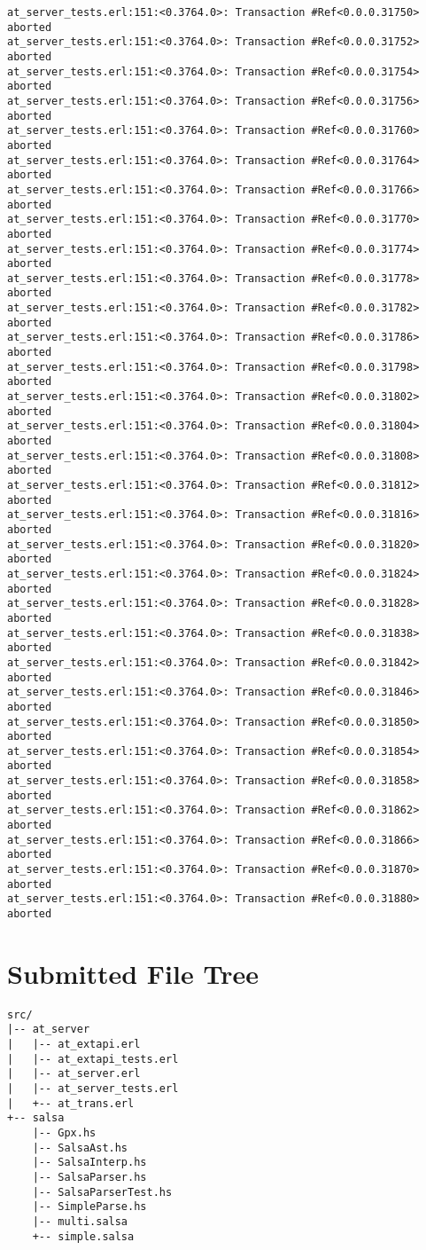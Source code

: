 \documentclass[
paper=a4,
oneside,
fontsize=11pt,
numbers=noenddot,
headinclude=false, %
footinclude=false, %
fleqn,             %
DIV=8
]{scrartcl}
\begin{document}
\begin{lstlisting}[caption=Session output: {\tt
    commit\_t\_competing\_test()} (debug enabled),
  label=lst:testoutcommit, basicstyle=\ttfamily\scriptsize]
at_server_tests.erl:151:<0.3764.0>: Transaction #Ref<0.0.0.31750> aborted
at_server_tests.erl:151:<0.3764.0>: Transaction #Ref<0.0.0.31752> aborted
at_server_tests.erl:151:<0.3764.0>: Transaction #Ref<0.0.0.31754> aborted
at_server_tests.erl:151:<0.3764.0>: Transaction #Ref<0.0.0.31756> aborted
at_server_tests.erl:151:<0.3764.0>: Transaction #Ref<0.0.0.31760> aborted
at_server_tests.erl:151:<0.3764.0>: Transaction #Ref<0.0.0.31764> aborted
at_server_tests.erl:151:<0.3764.0>: Transaction #Ref<0.0.0.31766> aborted
at_server_tests.erl:151:<0.3764.0>: Transaction #Ref<0.0.0.31770> aborted
at_server_tests.erl:151:<0.3764.0>: Transaction #Ref<0.0.0.31774> aborted
at_server_tests.erl:151:<0.3764.0>: Transaction #Ref<0.0.0.31778> aborted
at_server_tests.erl:151:<0.3764.0>: Transaction #Ref<0.0.0.31782> aborted
at_server_tests.erl:151:<0.3764.0>: Transaction #Ref<0.0.0.31786> aborted
at_server_tests.erl:151:<0.3764.0>: Transaction #Ref<0.0.0.31798> aborted
at_server_tests.erl:151:<0.3764.0>: Transaction #Ref<0.0.0.31802> aborted
at_server_tests.erl:151:<0.3764.0>: Transaction #Ref<0.0.0.31804> aborted
at_server_tests.erl:151:<0.3764.0>: Transaction #Ref<0.0.0.31808> aborted
at_server_tests.erl:151:<0.3764.0>: Transaction #Ref<0.0.0.31812> aborted
at_server_tests.erl:151:<0.3764.0>: Transaction #Ref<0.0.0.31816> aborted
at_server_tests.erl:151:<0.3764.0>: Transaction #Ref<0.0.0.31820> aborted
at_server_tests.erl:151:<0.3764.0>: Transaction #Ref<0.0.0.31824> aborted
at_server_tests.erl:151:<0.3764.0>: Transaction #Ref<0.0.0.31828> aborted
at_server_tests.erl:151:<0.3764.0>: Transaction #Ref<0.0.0.31838> aborted
at_server_tests.erl:151:<0.3764.0>: Transaction #Ref<0.0.0.31842> aborted
at_server_tests.erl:151:<0.3764.0>: Transaction #Ref<0.0.0.31846> aborted
at_server_tests.erl:151:<0.3764.0>: Transaction #Ref<0.0.0.31850> aborted
at_server_tests.erl:151:<0.3764.0>: Transaction #Ref<0.0.0.31854> aborted
at_server_tests.erl:151:<0.3764.0>: Transaction #Ref<0.0.0.31858> aborted
at_server_tests.erl:151:<0.3764.0>: Transaction #Ref<0.0.0.31862> aborted
at_server_tests.erl:151:<0.3764.0>: Transaction #Ref<0.0.0.31866> aborted
at_server_tests.erl:151:<0.3764.0>: Transaction #Ref<0.0.0.31870> aborted
at_server_tests.erl:151:<0.3764.0>: Transaction #Ref<0.0.0.31880> aborted
\end{lstlisting}

\clearpage
\section{Submitted File Tree}
\label{sec:submitted-files}

\begin{lstlisting}[caption=File tree under {\tt src/}, label=lst:filetree]
src/
|-- at_server
|   |-- at_extapi.erl
|   |-- at_extapi_tests.erl
|   |-- at_server.erl
|   |-- at_server_tests.erl
|   +-- at_trans.erl
+-- salsa
    |-- Gpx.hs
    |-- SalsaAst.hs
    |-- SalsaInterp.hs
    |-- SalsaParser.hs
    |-- SalsaParserTest.hs
    |-- SimpleParse.hs
    |-- multi.salsa
    +-- simple.salsa
\end{lstlisting}
\end{document}
